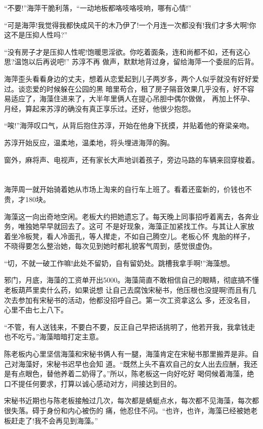 \documentclass[11pt,a4paper,onecolumn]{article}
\begin{document}
``不要!''海萍干脆利落，``一动地板都咯吱咯吱响，哪有心情!''

``可是海萍!我觉得我都快成风干的木乃伊了!一个月连一次都没有!我们才多大啊!你这不是压抑人性吗?''

``没有房子才是压抑人性呢!饱暖思淫欲。你吃着面条，连和尚都不如，还有这心思?温饱以后再说吧!'' 苏淳不再
做声，默默地背过身，留给海萍一个委屈的后背。

海萍歪头看看身边的丈夫，想着从恋爱起到儿子两岁多，两个人似乎就没有好好爱过。谈恋爱的时候躲在公园的黑
暗里苟合，租了房子隔音效果几乎没有，好不容易适应了，海藻住进来了，大半年里俩人在提心吊胆中偶尔做做，
再加上怀孕、月经，算起来苏淳的确没有真正享乐过。还好，他很少抱怨。

``唉!''海萍叹口气，从背后抱住苏淳，开始在他身下抚摸，并贴着他的脊梁亲吻。

苏淳开始反应，温柔地，温柔地，将头埋进海萍的胸。

窗外，麻将声、电视声，还有家长大声地训着孩子，旁边马路的车辆来回穿梭着。

\section[\thesection]{}

海萍周一就开始骑着她从市场上淘来的自行车上班了。看着还蛮新的，价钱也不贵，才180块。

海藻这一向出奇地空闲。老板大约把她遗忘了。每天晚上同事招呼着离去，各奔业务，唯独她早早就回去了。这可
不是好现象，海藻正加紧找工作。与其让人家放着坐冷板凳，看人冷面孔，等人撵走，不如自己腾空儿。老板心怀
鬼胎的样子，不晓得要怎么整治她，每次见到她时都礼貌客气周到，感觉很虚伪。

``切，不就一破工作嘛!此处不留奶，自有留奶处。跳槽我拿手啊!''海藻想。

邪门，月底，海藻的工资单开出5000。海藻简直不敢相信自己的眼睛，彻底搞不懂老板葫芦里卖什么药，如果说想
让自己去腐蚀宋秘书，他压根也没提啊!而且有几次去参加有宋秘书的活动，他都没招呼自己。第一次工资拿这么
多，还没名目，心里不由七上八下。

``不管，有人送钱来，不要白不要，反正自己早把话挑明了，他若开我，我拿钱走也不吃亏。''海藻暗暗打定主意。

陈老板内心里坚信海藻和宋秘书俩人有一腿，海藻肯定在宋秘书那里搬弄是非。自己对海藻好，宋秘书迟早也会知
道。``既然上头不喜欢自己的女人出去应酬，我还是有点眼色，替他养着二奶得了。''所以，陈老板这一向好吃好
喝伺候着海藻，绝口不提任何要求，打算以诚心感动对方，间接达到目的。

宋秘书近期也与陈老板接触过几次，每次都是蜻蜓点水，每次都不见海藻，每次都很失落。碍于身份和内心被伤的
痛，他忍住不问。``也许，也许，海藻已经被她老板赶走了!我不会再见到海藻。''
\end{document}
